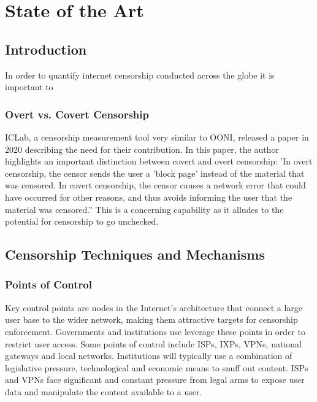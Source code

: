 \chapter{State of the Art}
\section{Introduction}

In order to quantify internet censorship conducted across the globe it is important to 

\subsection{Overt vs. Covert Censorship }
ICLab, a censorship measurement tool very similar to OONI, released a paper in 2020 describing the need for their contribution. In this paper, the author highlights an important distinction between covert and overt censorship: 'In overt censorship, the censor sends the user a 'block page' instead of the material that was censored. In covert censorship, the censor causes a network error that could have occurred for other reasons, and thus avoids informing the user that the material was censored.” \cite{9152784} This is a concerning capability as it alludes to the potential for censorship to go unchecked. 









\section{Censorship Techniques and Mechanisms} 

\subsection{Points of Control}
Key control points are nodes in the Internet’s architecture that connect a large user base to the wider network, making them attractive targets for censorship enforcement. Governments and institutions use leverage these points in order to restrict user access. Some points of control include ISPs, IXPs, VPNs, national gateways and local networks. Institutions will typically use a combination of legislative pressure, technological and economic means to snuff out content. ISPs and VPNs face significant and constant pressure from legal arms to expose user data and manipulate the content available to a user.

